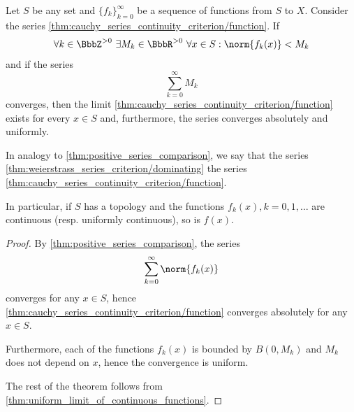 \begin{corollary}\label{thm:weierstrass_series_criterion}
  Let \( S \) be any set and \( \{ f_k \}_{k=0}^\infty \) be a sequence of functions from \( S \) to \( X \). Consider the series \cref{thm:cauchy_series_continuity_criterion/function}. If
  \begin{equation*}
    \forall k \in \BbbZ^{>0} \ \exists M_k \in \BbbR^{>0} \ \forall x \in S : \norm{f_k(x)} < M_k
  \end{equation*}
  and if the series
  \begin{equation}\label{thm:weierstrass_series_criterion/dominating}
    \sum_{k=0}^\infty M_k
  \end{equation}
  converges, then the limit \cref{thm:cauchy_series_continuity_criterion/function} exists for every \( x \in S \) and, furthermore, the series converges absolutely and uniformly.

  In analogy to \cref{thm:positive_series_comparison}, we say that the series \cref{thm:weierstrass_series_criterion/dominating}  the series \cref{thm:cauchy_series_continuity_criterion/function}.

  In particular, if \( S \) has a topology and the functions \( f_k(x), k = 0, 1, \ldots \) are continuous (resp. uniformly continuous), so is \( f(x) \).
\end{corollary}
\begin{proof}
  By \cref{thm:positive_series_comparison}, the series
  \begin{equation*}
    \sum_{k=0}^\infty \norm{f_k(x)}
  \end{equation*}
  converges for any \( x \in S \), hence \cref{thm:cauchy_series_continuity_criterion/function} converges absolutely for any \( x \in S \).

  Furthermore, each of the functions \( f_k(x) \) is bounded by \( B(0, M_k) \) and \( M_k \) does not depend on \( x \), hence the convergence is uniform.

  The rest of the theorem follows from \cref{thm:uniform_limit_of_continuous_functions}.
\end{proof}

